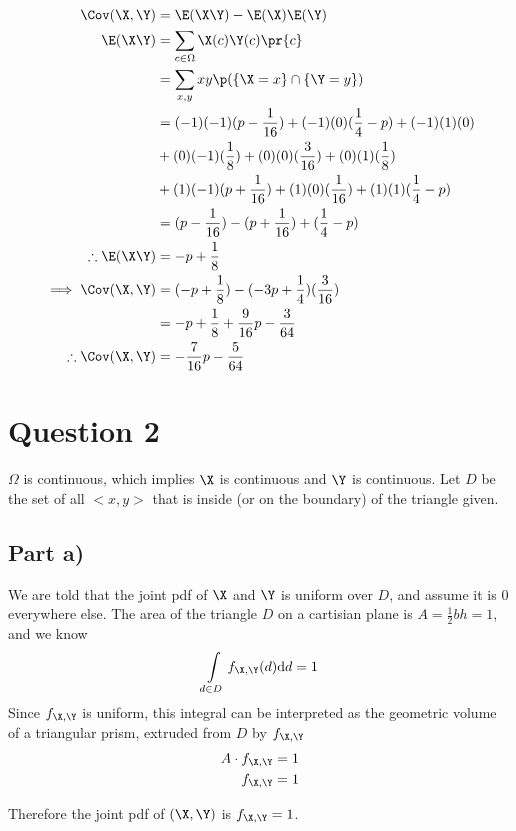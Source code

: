 \begin{align*}
\Cov(\X, \Y) &= \E(\X \Y) - \E(\X)\E(\Y) \\
\E(\X \Y) &= \sum _{c \in \Omega} \X(c)\Y(c)\pr{c} \\
&= \sum _{x,y} xy \p(\{ \X = x \} \cap \{ \Y = y \}) \\
&= (-1)(-1)(p - \frac{1}{16}) + (-1)(0)(\frac{1}{4} - p) + (-1)(1)(0) \\
&+ (0)(-1)(\frac{1}{8}) + (0)(0)(\frac{3}{16}) + (0)(1)(\frac{1}{8}) \\
&+ (1)(-1)(p + \frac{1}{16}) + (1)(0)(\frac{1}{16}) + (1)(1)(\frac{1}{4} - p) \\
&= (p - \frac{1}{16}) - (p + \frac{1}{16}) + (\frac{1}{4} - p) \\
\therefore \E(\X \Y) &= -p + \frac{1}{8} \\
\implies \Cov(\X, \Y) &= (-p + \frac{1}{8}) - (-3p + \frac{1}{4})(\frac{3}{16}) \\
&= -p + \frac{1}{8} + \frac{9}{16}p - \frac{3}{64} \\
\therefore \Cov(\X, \Y) &= -\frac{7}{16}p - \frac{5}{64}
\end{align*}

\newpage
\section{Question 2}

$\Omega$ is continuous, which implies $\X$ is continuous and $\Y$ is continuous.
Let $D$ be the set of all $<x, y>$ that is inside (or on the boundary) of the triangle given.

\subsection{Part a)}

We are told that the joint pdf of $\X$ and $\Y$ is uniform over $D$, and assume it is $0$ everywhere else.
The area of the triangle $D$ on a cartisian plane is $A = \frac{1}{2}bh = 1$, and we know
\[
\int \limits _{d\in D} f_{\X,\Y}(d) \mathrm{d}d = 1
\]
Since $f_{\X, \Y}$ is uniform, this integral can be interpreted as the geometric volume of a triangular prism,
extruded from $D$ by $f_{\X, \Y}$
\begin{align*}
A \cdot f_{\X, \Y} = 1 \\
f_{\X, \Y} = 1
\end{align*}

Therefore the joint pdf of $(\X, \Y)$ is $f_{\X, \Y} = 1$.

